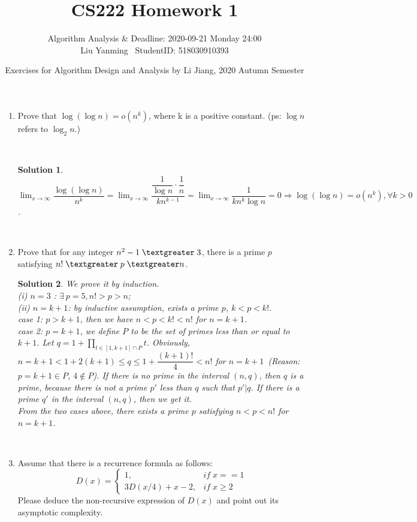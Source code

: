 \documentclass{article}
\title{CS222 Homework 1}
\author{Algorithm Analysis \& Deadline: 2020-09-21 Monday 24:00\\Liu Yanming \ StudentID: 518030910393}
\date{Exercises for Algorithm Design and Analysis by Li Jiang, 2020 Autumn Semester}
\newtheorem*{solution}{Solution}
\begin{document}
\maketitle

\begin{enumerate}

  \item Prove that $\log (\log n) = o(n^k)$, where k is a positive constant. (ps: $\log n$ refers to $\log_2 n$.)

~\\
\begin{solution}
$\lim_{x\rightarrow\infty}\dfrac{\log(\log n)}{n^k}=\lim_{x\rightarrow\infty}\dfrac{\dfrac{1}{\log n}\cdot\dfrac{1}{n}}{kn^{k-1}}=\lim_{x\rightarrow\infty}\dfrac{1}{kn^k\log n}=0\Rightarrow \log(\log n)=o(n^k), \forall k>0$.
\end{solution}
~\\

\item Prove that for any integer $n^2 -1\;\textgreater\;3$, there is a prime $p$ satisfying $n!\;\textgreater\;p\;\textgreater n$.
~\\
\begin{solution}
  We prove it by induction.\\
  (i) $n=3$ : $\exists\ p = 5, n! > p > n$;\\
  (ii) $n = k+1$: by inductive assumption, exists a prime $p$, $k < p < k!$.\\
    case 1: $p > k+1$, then we have $n  < p < k! < n!$ for $n = k+1$.\\
    case 2: $p = k+1$, we define $P$ to be the set of primes less than or equal to  $k+1$. Let $q = 1 + \prod_{t\in[1,k+1]\cap P}{t}$.
    Obviously, $n = k+1 < 1 + 2(k+1) \leq q \leq 1+\dfrac{(k+1)!}{4} < n!$ for $n = k+1$\ (Reason: $p=k+1\in P$, $4\notin P$). If there is no prime in the interval $(n, q)$, then $q$ is a prime, because there is not a prime $p'$ less than $q$ such that $p'|q$.
    If there is a prime $q'$ in the interval $(n,q)$, then we get it.\\
    From the two cases above, there exists a prime $p$ satisfying $n < p < n!$ for $n=k+1$.
    
\end{solution}
~\\
\item Assume that there is a recurrence formula as follows: 
\begin{equation*}
	D(x) = \begin{cases}
	1, &if\;x==1\\
	3D(x/4) + x - 2, &if\;x\geq2
	\end{cases}
\end{equation*}
Please deduce the non-recursive expression of $D(x)$ and point out its asymptotic complexity. 


\end{enumerate}
\end{document}
